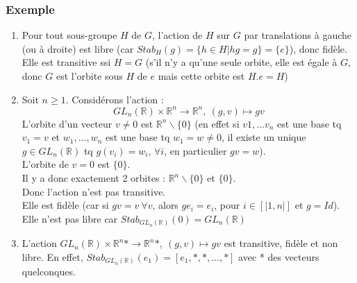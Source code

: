 \documentclass[a4paper, oneside]{report}
\newcommand{\x}{\times}
\newcommand{\R}{\mathbb{R}}
\newcommand{\exem}{\subsubsection{Exemple}}
\begin{document}
\exem
\begin{enumerate}
\item Pour tout sous-groupe $H$ de $G$, l'action de $H$ sur $G$ par translations à gauche (ou à droite) est libre (car $Stab_H(g)=\{h\in H |hg=g \}=\{e\}$), donc fidèle.\\
Elle est transitive ssi $H=G$ (s'il n'y a qu'une seule orbite, elle est égale à $G$, donc $G$ est l'orbite sous $H$ de $e$ mais cette orbite est $H.e=H$)
\item Soit $n\geq 1$. Considérons l'action :
$$GL_n(\R)\x \R^n \rightarrow \R^n,~(g,v)\mapsto gv $$
L'orbite d'un vecteur $v\neq 0$ est $\R^n\backslash \{0\}$ (en effet si $v1,...v_n$ est une base tq $v_1 = v$ et $w_1,...,w_n$ est une base tq $w_1=w\neq 0$, il existe un unique $g\in GL_n(\R)$ tq $g(v_i)=w_i$, $\forall i$, en particulier $gv=w$).\\
L'orbite de $v=0$ est $\{0\}$.\\
Il y a donc exactement 2 orbites : $\R^n\backslash \{0\}$ et $\{0\}$.\\
Donc l'action n'est pas transitive.\\
Elle est fidèle (car si $gv=v~\forall v$, alors $ge_i=e_i$, pour $i\in [|1,n|]$ et $g=Id$).\\
Elle n'est pas libre car $Stab_{GL_n(\R)}(0)=GL_n(\R)$

\item L'action $GL_n(\R)\x \R^n* \rightarrow \R^n*,~(g,v)\mapsto gv $ est transitive, fidèle et non libre. En effet, $Stab_{GL_n(\R)}(e_1)=[e_1,*,*,...,*]$ avec * des vecteurs quelconques.


\end{enumerate}
\end{document}
